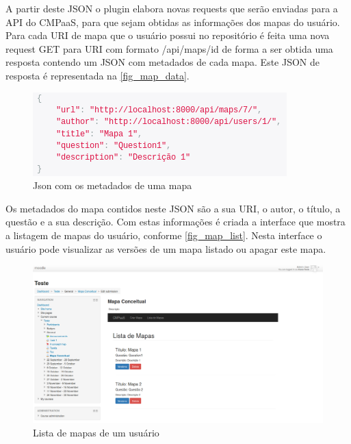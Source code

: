 \documentclass[
	12pt,				%
	openright,			%
	oneside,			%
	a4paper,			%
	english,			%
	french,				%
	spanish,			%
	brazil				%
	]{abntex2}
\begin{document}
A partir deste JSON o plugin elabora novas requests que serão enviadas para a API do CMPaaS, para que sejam obtidas as informações dos mapas do usuário. Para cada URI de mapa que o usuário possui no repositório é feita uma nova request GET para URI com formato /api/maps/id de forma a ser obtida uma resposta contendo um JSON com metadados de cada mapa. Este JSON de resposta é representada na \autoref{fig_map_data}.

\begin{figure}[htb]
	\caption{\label{fig_map_data} Json com os metadados de uma mapa}
	\begin{center}
		\includegraphics[scale=0.6]{map_data.png}
	\end{center}
\end{figure}

Os metadados do mapa contidos neste JSON são a sua URI, o autor, o título, a questão e a sua descrição. Com estas informações é criada a interface que mostra a listagem de mapas do usuário, conforme \autoref{fig_map_list}. Nesta interface o usuário pode visualizar as versões de um mapa listado ou apagar este mapa.

\begin{figure}[htb]
	\caption{\label{fig_map_list} Lista de mapas de um usuário}
	\begin{center}
		\includegraphics[scale=0.2]{map_list.png}
	\end{center}
\end{figure}
\end{document}
